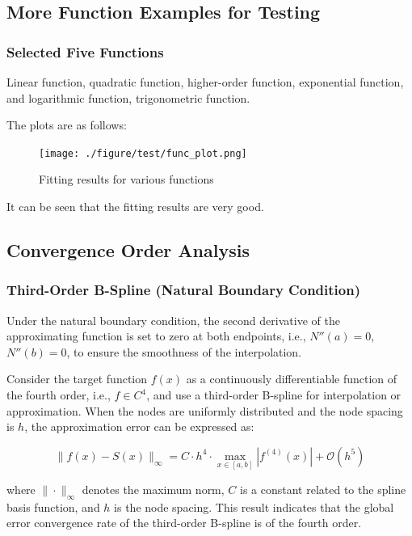 \documentclass[a4paper]{article}
\begin{document}
\subsection{More Function Examples for Testing}

\subsubsection{Selected Five Functions}

Linear function, quadratic function, higher-order function, exponential function, and logarithmic function, trigonometric function.

The plots are as follows:
\begin{figure}[H]
    \centering
    \texttt{[image: ./figure/test/func\_plot.png]}
    \caption{Fitting results for various functions}
\end{figure}

It can be seen that the fitting results are very good.

\subsection{Convergence Order Analysis}

\subsubsection{Third-Order B-Spline (Natural Boundary Condition)}

Under the natural boundary condition, the second derivative of the approximating function is set to zero at both endpoints, i.e., \(N''(a) = 0\), \(N''(b) = 0\), to ensure the smoothness of the interpolation.

Consider the target function \(f(x)\) as a continuously differentiable function of the fourth order, i.e., \(f \in C^4\), and use a third-order B-spline for interpolation or approximation. When the nodes are uniformly distributed and the node spacing is \(h\), the approximation error can be expressed as:

\[
\| f(x) - S(x) \|_\infty = C \cdot h^4 \cdot \max_{x \in [a, b]} |f^{(4)}(x)| + \mathcal{O}(h^5)
\]

where \(\| \cdot \|_\infty\) denotes the maximum norm, \(C\) is a constant related to the spline basis function, and \(h\) is the node spacing. This result indicates that the global error convergence rate of the third-order B-spline is of the fourth order.
\end{document}
